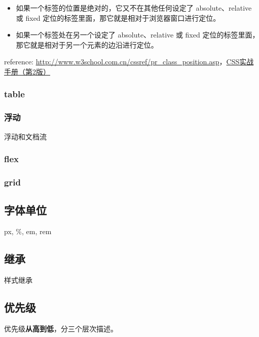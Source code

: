 \begin{itemize}
\tightlist
\item
  如果一个标签的位置是绝对的，它又不在其他任何设定了 absolute、relative
  或 fixed 定位的标签里面，那它就是相对于浏览器窗口进行定位。
\item
  如果一个标签处在另一个设定了 absolute、relative 或 fixed
  定位的标签里面，那它就是相对于另一个元素的边沿进行定位。
\end{itemize}

reference:
\url{http://www.w3school.com.cn/cssref/pr_class_position.asp}，\href{http://book.douban.com/subject/4861462/}{CSS实战手册（第2版）}

\subsubsection{table}\label{table}

\subsubsection{浮动}\label{ux6d6eux52a8}

浮动和文档流

\subsubsection{flex}\label{flex}

\subsubsection{grid}\label{grid}

\subsection{字体单位}\label{ux5b57ux4f53ux5355ux4f4d}

px, \%, em, rem

\subsection{继承}\label{ux7ee7ux627f}

样式继承

\subsection{优先级}\label{ux4f18ux5148ux7ea7}

优先级\textbf{从高到低}，分三个层次描述。

